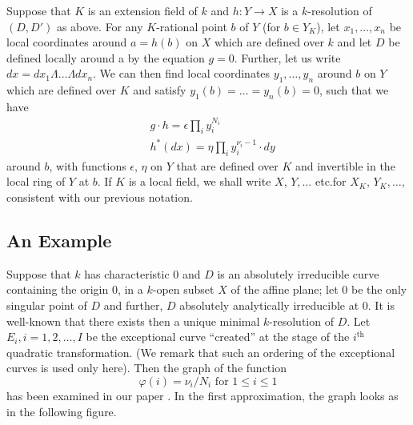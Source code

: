 Suppose that $K$ is an extension field of $k$ and $h:Y\to X$ is a
$k$-resolution of $(D,D')$ as above. For any $K$-rational point $b$ of
$Y$ (\ie for $b\in Y_{K}$), let $x_{1},\ldots,x_{n}$ be local
coordinates around $a=h(b)$ on $X$ which are defined over $k$ and let
$D$ be defined locally around a by the equation $g=0$. Further, let us
write $dx=dx_{1}\Lambda\ldots\Lambda dx_{n}$. We can then find local
coordinates $y_{1},\ldots,y_{n}$ around $b$ on $Y$ which are defined
over $K$ and satisfy $y_{1}(b)=\ldots=y_{n}(b)=0$, such that we have
\begin{align*}
& g\cdot h =\epsilon\prod_{i}y^{N_{i}}_{i}\\
& h^{\ast}(dx)=\eta\prod_{i}y_{i}^{\nu_{i}-1}\cdot
  dy\tag{81}\label{chap3:sec2:subsec2:eq81}
\end{align*}
around $b$, with functions $\epsilon$, $\eta$ on $Y$ that are defined
over $K$ and invertible in the local ring of $Y$ at $b$. If $K$ is a
local field, we shall write $X$, $Y,\ldots$ etc.\@ for $X_{K}$,
$Y_{K},\ldots$, consistent with our previous notation.

\subsection{An Example}\label{chap3:sec2:subsec3} %

Suppose that $k$ has characteristic $0$ and $D$ is an absolutely
irreducible curve containing the origin $0$, in a $k$-open subset $X$
of the affine plane; let $0$ be the only singular point of $D$ and
further, $D$ absolutely analytically irreducible at $0$. It is
well-known that there exists then a unique minimal $k$-resolution of
$D$. Let $E_{i},i=1,2,\ldots,I$ be the exceptional curve ``created''
at the stage of the $i^{\text{th}}$ quadratic transformation. (We
remark that such an ordering of the exceptional curves is used only
here). Then the graph of the function 
$$
\varphi(i)=\nu_{i}/N_{i}\text{ \ for \ } 1\leq i\leq 1
$$\pageoriginale
has been examined in our paper \cite{Igu 7}. In the first approximation,
the graph looks as in the following figure.

\begin{figure}[H]
\end{figure}

